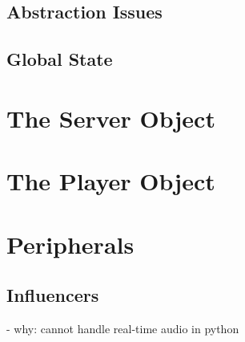 
\subsection{Abstraction Issues}\label{ssec:3-abstractions}



\subsection{Global State}\label{ssec:3-global-state}





\section{The Server Object}\label{ssec:3-server}



\section{The Player Object}\label{ssec:3-player}



\section{Peripherals}\label{ssec:3-peripherals}


\subsection{Influencers}\label{ssec:3-influencers}
- why: cannot handle real-time audio in python

